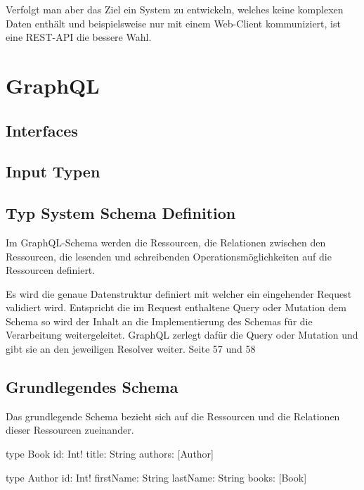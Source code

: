 \documentclass[bachelor, german ]{hgbthesis}
\begin{document}
Verfolgt man aber das Ziel ein System zu entwickeln, welches keine komplexen Daten enthält und beispielsweise nur mit einem Web-Client kommuniziert, ist eine REST-API die bessere Wahl.

\chapter{GraphQL}

\section{Interfaces}

\section{Input Typen}

\section{Typ System Schema Definition}

Im GraphQL-Schema werden die Ressourcen, die Relationen zwischen den Ressourcen, die lesenden und schreibenden Operationsmöglichkeiten auf die Ressourcen definiert.
\newline

Es wird die genaue Datenstruktur definiert mit welcher ein eingehender Request validiert wird.
Entspricht die im Request enthaltene Query oder Mutation dem Schema so wird der Inhalt an die Implementierung des Schemas für die Verarbeitung weitergeleitet.
GraphQL zerlegt dafür die Query oder Mutation und gibt sie an den jeweiligen Resolver weiter. Seite 57 und 58

\section{Grundlegendes Schema}
Das grundlegende Schema bezieht sich auf die Ressourcen und die Relationen dieser Ressourcen zueinander.

\begin{JsCode}
type Book {
    id: Int!
    title: String
    authors: [Author]
}
    
type Author {
    id: Int!
    firstName: String
    lastName: String
    books: [Book]
}
\end{JsCode}
\end{document}
